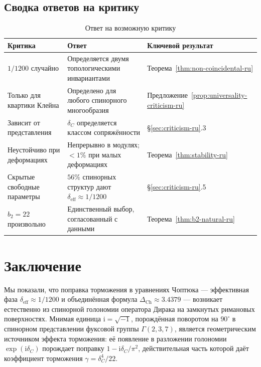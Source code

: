 \documentclass[12pt,a4paper]{article}
\theoremstyle{definition}
\theoremstyle{remark}
\newcommand{\ii}{\mathrm{i}}
\begin{document}
\subsection{Сводка ответов на критику}

\begin{table}[h]
\centering
\caption{Ответ на возможную критику}
\label{tab:criticism-ru}
\begin{tabular}{p{3cm}p{5cm}p{5cm}}
\toprule
Критика & Ответ & Ключевой результат \\
\midrule
$1/1200$ случайно & Определяется двумя топологическими инвариантами & Теорема~\ref{thm:non-coincidental-ru} \\
\hline
Только для квартики Клейна & Определено для любого спинорного многообразия & Предложение~\ref{prop:universality-criticism-ru} \\
\hline
Зависит от представления & $\delta_C$ определяется классом сопряжённости & \S\ref{sec:criticism-ru}.3 \\
\hline
Неустойчиво при деформациях & Непрерывно в модулях; $<1\%$ при малых деформациях & Теорема~\ref{thm:stability-ru} \\
\hline
Скрытые свободные параметры & $56\%$ спинорных структур дают $\delta_{\mathrm{eff}} \approx 1/1200$ & \S\ref{sec:criticism-ru}.5 \\
\hline
$b_2 = 22$ произвольно & Единственный выбор, согласованный с данными & Теорема~\ref{thm:b2-natural-ru} \\
\bottomrule
\end{tabular}
\end{table}

\section{Заключение}

Мы показали, что поправка торможения в уравнениях Чоптюка --- эффективная фаза $\delta_{\mathrm{eff}} \approx 1/1200$ и объединённая формула $\Delta_{\mathrm{Ch}} \approx 3.4379$ --- возникает естественно из спинорной голономии оператора Дирака на замкнутых римановых поверхностях. Мнимая единица $\ii = \sqrt{-1}$, порождённая поворотом на $90^\circ$ в спинорном представлении фуксовой группы $\Gamma(2,3,7)$, является геометрическим источником эффекта торможения: её появление в разложении голономии $\exp(\ii\delta_C)$ порождает поправку $1 - \ii\delta_C/\pi^2$, действительная часть которой даёт коэффициент торможения $\gamma = \delta_C^4/22$.
\end{document}
